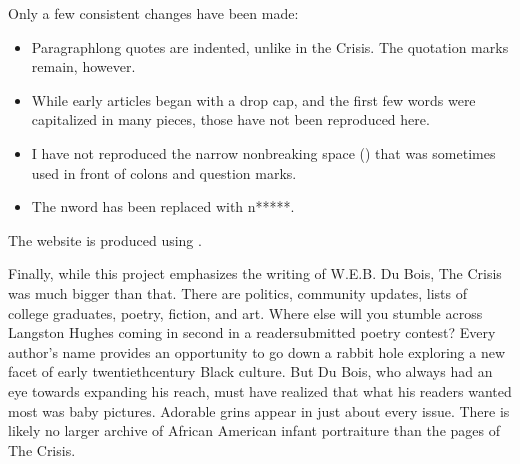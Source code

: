\documentclass[letterpaper,10pt,english]{jupyterBook}
\begin{document}
\sphinxAtStartPar
Only a few consistent changes have been made:
\begin{itemize}
\item {} 
\sphinxAtStartPar
Paragraph\sphinxhyphen{}long quotes are indented, unlike in the Crisis. The quotation marks remain, however.

\item {} 
\sphinxAtStartPar
While early articles began with a drop cap, and the first few words were capitalized in many pieces, those have not been reproduced here.

\item {} 
\sphinxAtStartPar
I have not reproduced the narrow non\sphinxhyphen{}breaking space () that was sometimes used in front of colons and question marks.

\item {} 
\sphinxAtStartPar
The n\sphinxhyphen{}word has been replaced with n*****.

\end{itemize}

\sphinxAtStartPar
The website is produced using .

\sphinxAtStartPar
Finally, while this project emphasizes the writing of W.E.B. Du Bois, The Crisis was much bigger than that. There are politics, community updates, lists of college graduates, poetry, fiction, and art. Where else will you stumble across Langston Hughes coming in second in a reader\sphinxhyphen{}submitted poetry contest? Every author’s name provides an opportunity to go down a rabbit hole exploring a new facet of early twentieth\sphinxhyphen{}century Black culture. But Du Bois, who always had an eye towards expanding his reach, must have realized that what his readers wanted most was baby pictures. Adorable grins appear in just about every issue. There is likely no larger archive of African American infant portraiture than the pages of The Crisis.
\end{document}
